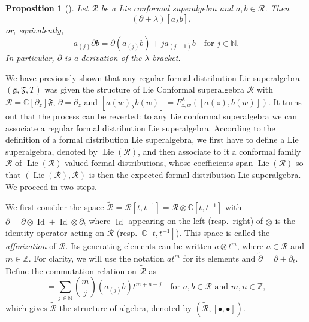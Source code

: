 \documentclass[a4paper, 12pt, reqno]{amsart}
\newtheorem{proposition}[theorem]{Proposition}
\theoremstyle{remark}
\numberwithin{equation}{subsection}
\DeclareMathOperator{\Id}{Id}
\DeclareMathOperator{\Lie}{Lie}
\begin{document}
\begin{proposition}[{\cite[Remark 2.5.3]{nozaradan_introduction_2008}}]
  \label{prp:4}
  Let $\mathcal{R}$ be a Lie conformal superalgebra and $a, b \in \mathcal{R}$.
  Then
  \begin{equation*}
    [a_{\lambda}\partial b] = (\partial + \lambda)[a_{\lambda}b],
  \end{equation*}
  or, equivalently,
  \begin{equation*}
    a_{(j)}\partial b = \partial(a_{(j)}b) + ja_{(j - 1)}b \quad \text{for }j \in \mathbb{N}.
  \end{equation*}
  In particular, $\partial$ is a derivation of the $\lambda$-bracket.
\end{proposition}

We have previously shown that any regular formal distribution Lie superalgebra $(\mathfrak{g}, \mathfrak{F}, T)$ was given the structure of Lie Conformal superalgebra $\mathcal{R}$ with $\mathcal{R} = \mathbb{C}[\partial_z]\mathfrak{F}$, $\partial = \partial_z$ and $[a(w)_{\lambda}b(w)] = F^{\lambda}_{z, w}([a(z), b(w)])$.
It turns out that the process can be reverted: to any Lie conformal superalgebra we can associate a regular formal distribution Lie superalgebra.
According to the definition of a formal distribution Lie superalgebra, we first have to define a Lie superalgebra, denoted by $\Lie(\mathcal{R})$, and then associate to it a conformal family $\mathcal{R}$ of $\Lie(\mathcal{R})$-valued formal distributions, whose coefficients span $\Lie(\mathcal{R})$ so that $(\Lie(\mathcal{R}), \mathcal{R})$ is then the expected formal distribution Lie superalgebra.
We proceed in two steps.

We first consider the space $\widetilde{\mathcal{R}} = \mathcal{R}[t, t^{-1}] = \mathcal{R} \otimes \mathbb{C}[t, t^{-1}]$ with $\widetilde{\partial} = \partial \otimes \Id + \Id \otimes \partial_t$ where $\Id$ appearing on the left (resp.\ right) of $\otimes$ is the identity operator acting on $\mathcal{R}$ (resp.\ $\mathbb{C}[t, t^{-1}]$).
This space is called the \emph{affinization} of $\mathcal{R}$.
Its generating elements can be written $a\otimes t^m$, where $a \in \mathcal{R}$ and $m \in \mathbb{Z}$.
For clarity, we will use the notation $at^m$ for its elements and $\widetilde{\partial} = \partial + \partial_t$.
Define the commutation relation on $\widetilde{\mathcal{R}}$ as
\begin{equation*}
  [at^m, bt^n] = \sum_{j \in \mathbb{N}}\binom{m}{j}(a_{(j)}b)t^{m + n - j} \quad \text{for }a, b \in \mathcal{R}\text{ and }m, n \in \mathbb{Z},
\end{equation*}
which gives $\widetilde{\mathcal{R}}$ the structure of algebra, denoted by $(\widetilde{\mathcal{R}},[\bullet, \bullet])$.
\end{document}
